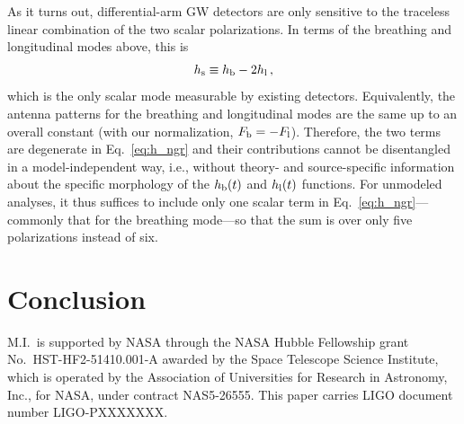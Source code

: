 \documentclass[aps,prd,twocolumn,superscriptaddress,preprintnumbers,floatfix,nofootinbib]{revtex4-2}
\newcommand{\beq}{\begin{equation}}
\newcommand{\eeq}{\end{equation}}
\newcommand{\dcc}{LIGO-PXXXXXXX}
\begin{document}
As it turns out, differential-arm GW detectors are only sensitive to the traceless linear combination of the two scalar polarizations.
In terms of the breathing and longitudinal modes above, this is
\beq
h_{\rm s} \equiv \hb - 2\hlon\, ,
\eeq
which is the only scalar mode measurable by existing detectors.
Equivalently, the antenna patterns for the breathing and longitudinal modes are the same up to an overall constant (with our normalization, $F_{{\rm b}} = -F_{{\rm l}}$).
Therefore, the two terms are degenerate in Eq.~\eqref{eq:h_ngr} and their contributions cannot be disentangled in a model-independent way, i.e., without theory- and source-specific information about the specific morphology of the $h_{{\rm b}}(t)$ and $h_{{\rm l}}(t)$ functions.
For unmodeled analyses, it thus suffices to include only one scalar term in Eq.~\eqref{eq:h_ngr}---commonly that for the breathing mode---so that the sum is over only five polarizations instead of six.

\section{Conclusion}

\begin{acknowledgments}
M.I.\ is supported by NASA through the NASA Hubble Fellowship
grant No.\ HST-HF2-51410.001-A awarded by the Space Telescope
Science Institute, which is operated by the Association of Universities
for Research in Astronomy, Inc., for NASA, under contract NAS5-26555.
This paper carries LIGO document number \dcc{}.
\end{acknowledgments}

\end{document}
